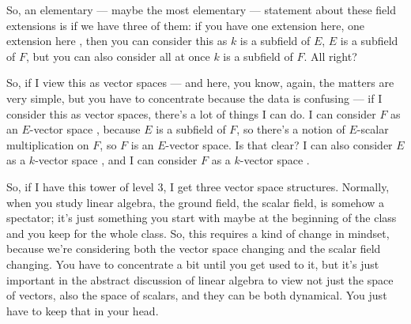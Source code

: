 \begin{speech}[00:19:53 - 00:21:52]
So, an elementary --- maybe the most elementary --- statement about these field extensions is if we have three of them: if you have one extension here, one extension here , then you can consider this as $k$ is a subfield of $E$, $E$ is a subfield of $F$, but you can also consider all at once $k$ is a subfield of $F$. All right?

So, if I view this as vector spaces --- and here, you know, again, the matters are very simple, but you have to concentrate because the data is confusing --- if I consider this as vector spaces, there's a lot of things I can do. I can consider $F$ as an $E$-vector space , because $E$ is a subfield of $F$, so there's a notion of $E$-scalar multiplication on $F$, so $F$ is an $E$-vector space. Is that clear? I can also consider $E$ as a $k$-vector space , and I can consider $F$ as a $k$-vector space .

So, if I have this tower of level $3$, I get three vector space structures. Normally, when you study linear algebra, the ground field, the scalar field, is somehow a spectator; it's just something you start with maybe at the beginning of the class and you keep for the whole class. So, this requires a kind of change in mindset, because we're considering both the vector space changing and the scalar field changing. You have to concentrate a bit until you get used to it, but it's just important in the abstract discussion of linear algebra to view not just the space of vectors, also the space of scalars, and they can be both dynamical. You just have to keep that in your head.
\end{speech}

